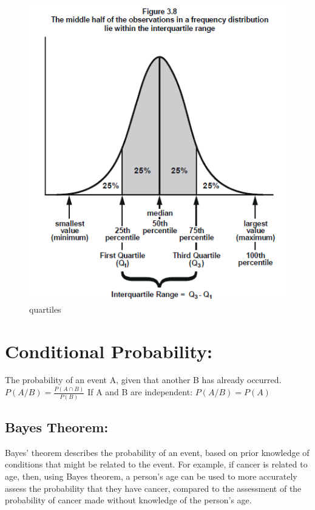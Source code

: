 \documentclass[]{article}
\begin{document}
\begin{figure}
\centering
\includegraphics{quartiles.png}
\caption{quartiles}
\end{figure}

\hypertarget{conditional-probability}{%
\section{Conditional Probability:}\label{conditional-probability}}

The probability of an event A, given that another B has already
occurred. \(P(A/B)=\frac {P(A\cap B)}{P(B)}\) If A and B are
independent: \(P(A/B)=P(A)\)

\hypertarget{bayes-theorem}{%
\subsection{Bayes Theorem:}\label{bayes-theorem}}

Bayes' theorem describes the probability of an event, based on prior
knowledge of conditions that might be related to the event. For example,
if cancer is related to age, then, using Bayes theorem, a person's age
can be used to more accurately assess the probability that they have
cancer, compared to the assessment of the probability of cancer made
without knowledge of the person's age.
\end{document}
